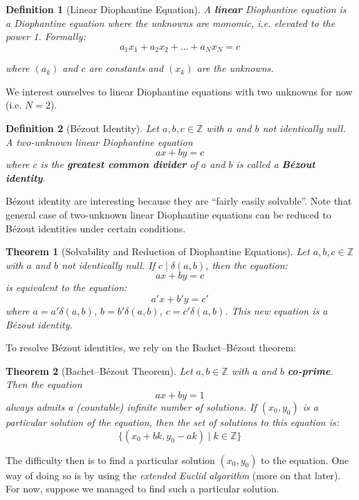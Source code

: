 \documentclass{article}
\newtheorem{definition}{Definition}
\newtheorem{theorem}{Theorem}
\newcommand{\divi}{\mathbin{\mid}}
\begin{document}
\begin{definition}[Linear Diophantine Equation]
A \textbf{linear} Diophantine equation is a Diophantine equation where the unknowns are monomic, i.e. elevated to the power 1. Formally:
$$a_1 x_1 + a_2 x_2 + \ldots + a_N x_N = c$$

\noindent where $(a_k)$ and $c$ are constants and $(x_k)$ are the unknowns.
\end{definition}

We interest ourselves to linear Diophantine equations with two unknowns for now (i.e. $N = 2$).

\begin{definition}[Bézout Identity]
Let $a,b,c \in \mathbb{Z}$ with $a$ and $b$ not identically null. A two-unknown linear Diophantine equation
$$a x + b y = c$$
\noindent where $c$ is the \textbf{greatest common divider} of $a$ and $b$ is called a \textbf{Bézout identity}.
\end{definition}

Bézout identity are interesting because they are ``fairly easily solvable''. Note that general case of two-unknown linear Diophantine equations can be reduced to Bézout identities under certain conditions.

\begin{theorem}[Solvability and Reduction of Diophantine Equations]\label{th:solv}
Let $a,b,c \in \mathbb{Z}$ with $a$ and $b$ not identically null. If $c \divi \delta(a,b)$, then the equation:
$$a x + b y = c$$
\noindent is equivalent to the equation:
$$a' x + b' y = c'$$
\noident where $a = a' \delta(a,b)$, $b = b' \delta(a,b)$, $c = c' \delta(a,b)$. This new equation is a Bézout identity.
\end{theorem}

To resolve Bézout identities, we rely on the Bachet--Bézout theorem:

\begin{theorem}[Bachet--Bézout Theorem]
Let $a,b \in \mathbb{Z}$ with $a$ and $b$ \textbf{co-prime}. Then the equation
$$a x + b y = 1$$
\noindent always admits a (countable) infinite number of solutions. If $(x_0,y_0)$ is a particular solution of the equation, then the set of solutions to this equation is:
$$\{ (x_0 + b k, y_0 - a k) \mid k \in \mathbb{Z} \}$$
\end{theorem}

The difficulty then is to find a particular solution $(x_0,y_0)$ to the equation. One way of doing so is by using the \textit{extended Euclid algorithm} (more on that later). For now, suppose we managed to find such a particular solution.
\end{document}
